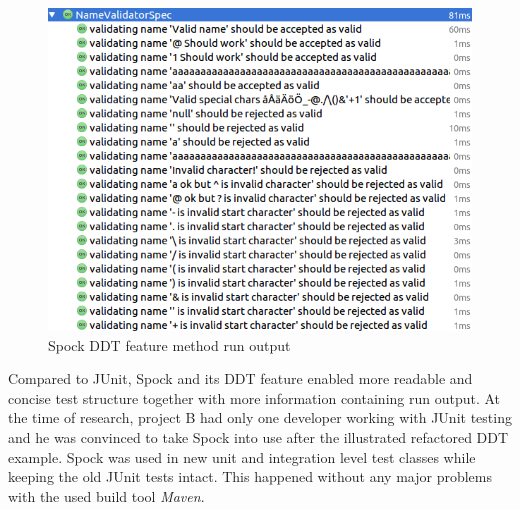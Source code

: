     \clearpage

    \begin{figure}[H]
      \begin{center}
        \begin{topbot}[style=mdstyle]
        \includegraphics[width=\textwidth]{images/spock-validator-results.png}
        \end{topbot}
        \caption{Spock DDT feature method run output}
        \label{fig:spock-bit-results}
      \end{center}
    \end{figure}

    Compared to JUnit, Spock and its DDT feature enabled more readable and concise test structure together with more information
    containing run output. At the time of research, project B had only one developer working with JUnit testing and
    he was convinced to take Spock into use after the illustrated refactored DDT example. Spock was used in new unit and
    integration level test classes while keeping the old JUnit tests intact. This happened without any major
    problems with the used build tool \textit{Maven}.


